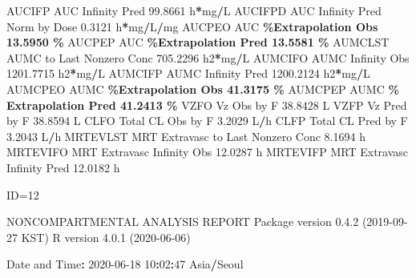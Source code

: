 \documentclass[
  10pt,
]{krantz}
\makeatletter
\newenvironment{Shaded}{\begin{snugshade}}{\end{snugshade}}
\newcommand{\DecValTok}[1]{\textcolor[rgb]{0.00,0.00,0.81}{#1}}
\newcommand{\FloatTok}[1]{\textcolor[rgb]{0.00,0.00,0.81}{#1}}
\newcommand{\NormalTok}[1]{#1}
\newcommand{\OperatorTok}[1]{\textcolor[rgb]{0.81,0.36,0.00}{\textbf{#1}}}
\newcommand{\StringTok}[1]{\textcolor[rgb]{0.31,0.60,0.02}{#1}}
\newenvironment{kframe}{%
\medskip{}
\setlength{\fboxsep}{.8em}
 \def\at@end@of@kframe{}%
 \ifinner\ifhmode%
  \def\at@end@of@kframe{\end{minipage}}%
  \begin{minipage}{\columnwidth}%
 \fi\fi%
 \def\FrameCommand##1{\hskip\@totalleftmargin \hskip-\fboxsep
 \colorbox{shadecolor}{##1}\hskip-\fboxsep
     \hskip-\linewidth \hskip-\@totalleftmargin \hskip\columnwidth}%
 \MakeFramed {\advance\hsize-\width
   \@totalleftmargin\z@ \linewidth\hsize
   \@setminipage}}%
 {\par\unskip\endMakeFramed%
 \at@end@of@kframe}
\renewenvironment{Shaded}{\begin{kframe}}{\end{kframe}}
\makeatother
\begin{document}
\begin{Shaded}
\begin{Highlighting}[]
\NormalTok{AUCIFP     AUC Infinity Pred                              }\FloatTok{99.8661}\NormalTok{ h}\OperatorTok{*}\NormalTok{mg}\OperatorTok{/}\NormalTok{L}
\NormalTok{AUCIFPD    AUC Infinity Pred Norm by Dose                  }\FloatTok{0.3121}\NormalTok{ h}\OperatorTok{*}\NormalTok{mg}\OperatorTok{/}\NormalTok{L}\OperatorTok{/}\NormalTok{mg}
\NormalTok{AUCPEO     AUC }\OperatorTok{\%Extrapolation Obs                         13.5950 \%}
\NormalTok{AUCPEP     AUC }\OperatorTok{\%Extrapolation Pred                        13.5581 \%}
\NormalTok{AUMCLST    AUMC to Last Nonzero Conc                     }\FloatTok{705.2296}\NormalTok{ h2}\OperatorTok{*}\NormalTok{mg}\OperatorTok{/}\NormalTok{L}
\NormalTok{AUMCIFO    AUMC Infinity Obs                            }\FloatTok{1201.7715}\NormalTok{ h2}\OperatorTok{*}\NormalTok{mg}\OperatorTok{/}\NormalTok{L}
\NormalTok{AUMCIFP    AUMC Infinity Pred                           }\FloatTok{1200.2124}\NormalTok{ h2}\OperatorTok{*}\NormalTok{mg}\OperatorTok{/}\NormalTok{L}
\NormalTok{AUMCPEO    AUMC }\OperatorTok{\%Extrapolation Obs                        41.3175 \%}
\NormalTok{AUMCPEP    AUMC }\OperatorTok{\% Extrapolation Pred                      41.2413 \%}
\NormalTok{VZFO       Vz Obs by F                                    }\FloatTok{38.8428}\NormalTok{ L}
\NormalTok{VZFP       Vz Pred by F                                   }\FloatTok{38.8594}\NormalTok{ L}
\NormalTok{CLFO       Total CL Obs by F                               }\FloatTok{3.2029}\NormalTok{ L}\OperatorTok{/}\NormalTok{h}
\NormalTok{CLFP       Total CL Pred by F                              }\FloatTok{3.2043}\NormalTok{ L}\OperatorTok{/}\NormalTok{h}
\NormalTok{MRTEVLST   MRT Extravasc to Last Nonzero Conc              }\FloatTok{8.1694}\NormalTok{ h}
\NormalTok{MRTEVIFO   MRT Extravasc Infinity Obs                     }\FloatTok{12.0287}\NormalTok{ h}
\NormalTok{MRTEVIFP   MRT Extravasc Infinity Pred                    }\FloatTok{12.0182}\NormalTok{ h}





\NormalTok{ID=}\DecValTok{12}

\NormalTok{                        NONCOMPARTMENTAL ANALYSIS REPORT}
\NormalTok{                       Package version }\DecValTok{0}\NormalTok{.}\FloatTok{4.2}\NormalTok{ (}\DecValTok{2019{-}09{-}27}\NormalTok{ KST)}
\NormalTok{                          R version }\DecValTok{4}\NormalTok{.}\FloatTok{0.1}\NormalTok{ (}\DecValTok{2020{-}06{-}06}\NormalTok{)}

\NormalTok{Date and Time}\OperatorTok{:}\StringTok{ }\DecValTok{2020{-}06{-}18} \DecValTok{10}\OperatorTok{:}\DecValTok{02}\OperatorTok{:}\DecValTok{47}\NormalTok{ Asia}\OperatorTok{/}\NormalTok{Seoul}


\end{Highlighting}
\end{Shaded}
\end{document}
